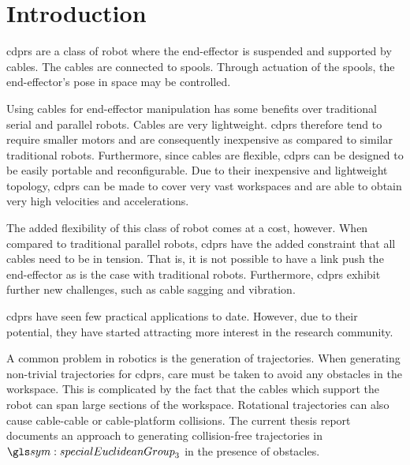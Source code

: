\chapter{Introduction}%
\label{chap:introduction}

	\glsresetall

	\glspl{cdpr} are a class of robot where the end-effector is suspended and
	supported by cables. The cables are connected to spools. Through actuation
	of the spools, the end-effector's pose in space may be
	controlled.\cite{bib:cdpr:cable_driven_parallel_robots_theory_and_application}

	Using cables for end-effector manipulation has some benefits over
	traditional serial and parallel robots. Cables are very lightweight.
	\glspl{cdpr} therefore tend to require smaller motors and are consequently
	inexpensive as compared to similar traditional robots. Furthermore, since
	cables are flexible, \glspl{cdpr} can be designed to be easily portable and
	reconfigurable. Due to their inexpensive and lightweight topology,
	\glspl{cdpr} can be made to cover very vast workspaces and are able to
	obtain very high velocities and
	accelerations.\cite{bib:cdpr:cable_driven_parallel_robots_theory_and_application}

	The added flexibility of this class of robot comes at a cost, however. When
	compared to traditional parallel robots, \glspl{cdpr} have the added
	constraint that all cables need to be in tension. That is, it is not
	possible to have a link push the end-effector as is the case with
	traditional robots. Furthermore, \glspl{cdpr} exhibit further new
	challenges, such as cable sagging and vibration.

	\glspl{cdpr} have seen few practical applications to date. However, due to
	their potential, they have started attracting more interest in the research
	community.

	A common problem in robotics is the generation of trajectories.  When
	generating non-trivial trajectories for \glspl{cdpr}, care must be taken to
	avoid any obstacles in the workspace. This is complicated by the fact that
	the cables which support the robot can span large sections of the workspace.
	Rotational trajectories can also cause cable-cable or cable-platform
	collisions. The current thesis report documents an approach to generating
	collision-free trajectories in $\specialEuclideanGroup{3}$ in the presence
	of obstacles.

